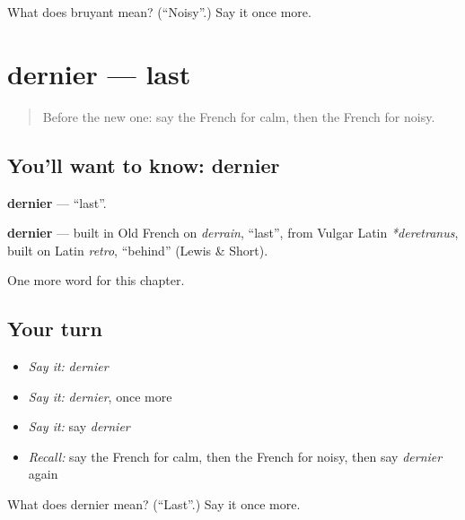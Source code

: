 \begin{tcolorbox}[breakable,colback=teal!4,colframe=teal!35!black,title={Before you move on}]
What does bruyant mean? (\textquotedblleft{}Noisy\textquotedblright{}.) Say it once more.
\end{tcolorbox}
\section[dernier]{dernier — last}

\label{lesson:FR-C132-dernier}



\begin{quote}
Before the new one: say the French for calm, then the French for noisy.
\end{quote}

\subsection*{You'll want to know: dernier}
\textbf{dernier} — \textquotedblleft{}last\textquotedblright{}.

\begin{cousinweb}
\textbf{dernier} — built in Old French on \emph{derrain}, \textquotedblleft{}last\textquotedblright{}, from Vulgar Latin \emph{*deretranus}, built on Latin \emph{retro}, \textquotedblleft{}behind\textquotedblright{} (Lewis \& Short).
\end{cousinweb}

\begin{grammarlens}[title={What you've built}]
One more word for this chapter.
\end{grammarlens}

\subsection*{Your turn}
\begin{itemize}
\raggedright
  \item \emph{Say it:} \emph{dernier}
  \item \emph{Say it:} \emph{dernier}, once more
  \item \emph{Say it:} say \emph{dernier}
  \item \emph{Recall:} say the French for calm, then the French for noisy, then say \emph{dernier} again
\end{itemize}

\begin{tcolorbox}[breakable,colback=teal!4,colframe=teal!35!black,title={Before you move on}]
What does dernier mean? (\textquotedblleft{}Last\textquotedblright{}.) Say it once more.
\end{tcolorbox}
